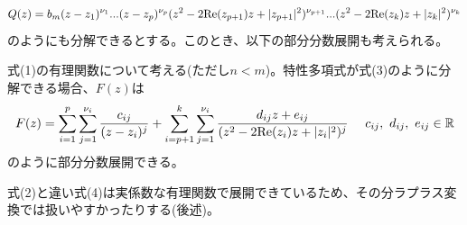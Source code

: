 \documentclass[dvipdfmx, 9pt, a4paper]{jsarticle}
\begin{document}
\begin{equation}
Q(z)=b_m(z-z_1)^{\nu_1}...(z-z_p)^{\nu_p}(z^2-2{\rm Re}(z_{p+1})z+|z_{p+1}|^2)^{\nu_{p+1}}...(z^2-2{\rm Re}(z_k)z+|z_k|^2)^{\nu_k}
\end{equation}
のようにも分解できるとする。このとき、以下の部分分数展開も考えられる。
\begin{tcolorbox}[title=部分分数展開(係数も実数となる方法)]
式(1)の有理関数について考える(ただし$n<m$)。特性多項式が式(3)のように分解できる場合、$F(z)$は
\begin{equation}
F(z)=\sum_{i=1}^p\sum_{j=1}^{\nu_i}\frac{c_{ij}}{(z-z_i)^j}+\sum_{i=p+1}^k\sum_{j=1}^{\nu_i}\frac{d_{ij}z+e_{ij}}{(z^2-2{\rm Re}(z_i)z+|z_i|^2)^j}~~~~c_{ij},~d_{ij},~e_{ij} \in \mathbb{R}
\end{equation}
のように部分分数展開できる。
\end{tcolorbox}
式(2)と違い式(4)は実係数な有理関数で展開できているため、その分ラプラス変換では扱いやすかったりする(後述)。
\end{document}
